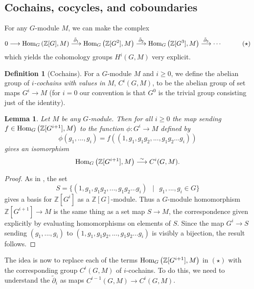\documentclass[11pt]{amsart}
\numberwithin{equation}{section}
\newtheorem{lemma}[equation]{Lemma}
\theoremstyle{remark}
\theoremstyle{remark}
\theoremstyle{remark}
\theoremstyle{definition}
\theoremstyle{definition}
\theoremstyle{definition}
\newtheorem{defi}[equation]{Definition}
\theoremstyle{definition}
\theoremstyle{definition}
\theoremstyle{definition}
\begin{document}
\subsection{Cochains, cocycles, and coboundaries}

For any $G$-module $M$, we can make the complex 
\[0\longrightarrow \textup{Hom}_{G}\left(\mathbb{Z}[G],M\right)\stackrel{\tilde{\partial}_1}{\longrightarrow}\textup{Hom}_{G}\left(\mathbb{Z}[G^2],M\right)\stackrel{\tilde{\partial}_2}{\longrightarrow}\textup{Hom}_{G}\left(\mathbb{Z}[G^3],M\right)\stackrel{\tilde{\partial}_3}{\longrightarrow} \cdots\phantom{hellooo}(\star)\] 
which yields the cohomology groups $H^i(G,M)$ very explicit. 

\begin{defi}[Cochains]
For a $G$-module $M$ and $i\geq 0$, we define the abelian group of $i$\textit{-cochains with values in }$M$, $C^i(G,M)$, to be the abelian group of set maps $G^i\rightarrow M$ (for $i=0$ our convention is that $G^0$ is the trivial group consisting just of the identity).
\end{defi}

\begin{lemma} \label{equiv with cochains}
Let $M$ be any $G$-module. Then for all $i\geq 0$ the map sending  $f\in \textup{Hom}_G\left(\mathbb{Z}[G^{i+1}],M\right)$ to the function $\phi:G^i\rightarrow M$ defined by
\[\phi(g_1,...,g_i)=f((1,g_1,g_1g_2,...,g_1g_2...g_i))\]
gives an isomorphism \[\textup{Hom}_G\left(\mathbb{Z}[G^{i+1}],M\right)\stackrel{\sim}{\longrightarrow} C^i(G,M).\]
\end{lemma}

\begin{proof}
As in , the set \[S=\{(1,g_1,g_1g_2,...,g_1g_2...g_i)~~\mid~~g_1,...,g_i\in G\}\]
gives a basis for $\mathbb{Z}[G^i]$ as a $\mathbb{Z}[G]$-module. Thus a $G$-module homomorphism $\mathbb{Z}[G^{i+1}]\rightarrow M$ is the same thing as a set map $S\rightarrow M$, the correspondence given explicitly by evaluating homomorphisms on elements of $S$. Since the map $G^i\rightarrow S$ sending $(g_1,...,g_i)$ to $(1,g_1,g_1g_2,...,g_1g_2...g_i)$ is visibly a bijection, the result follows. 
\end{proof}

The idea is now to replace each of the terms $\textup{Hom}_G\left(\mathbb{Z}[G^{i+1}],M\right)$ in $(\star)$ with the corresponding group $C^i(G,M)$ of $i$-cochains. To do this, we need to understand the $\tilde{\partial}_i$ as maps $C^{i-1}(G,M)\rightarrow C^{i}(G,M)$.
\end{document}
